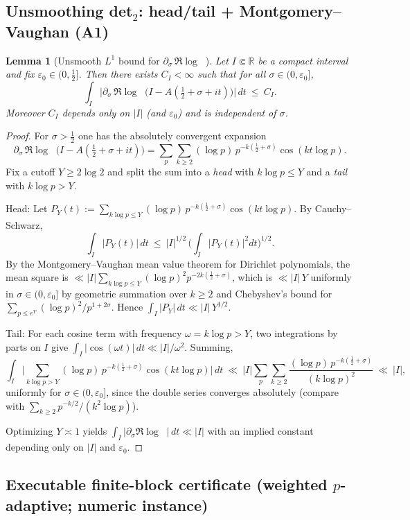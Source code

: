 \documentclass[11pt]{article}
\newtheorem{lemma}[theorem]{Lemma}
\theoremstyle{definition}
\theoremstyle{remark}
\newcommand{\R}{\mathbb{R}}
\DeclareMathOperator{\dettwo}{det_2}
\begin{document}
\subsection*{Unsmoothing det$_2$: head/tail + Montgomery--Vaughan (A1)}
\begin{lemma}[Unsmooth $L^1$ bound for $\partial_\sigma\,\Re\log\dettwo$]\label{lem:det2-unsmoothed}
Let $I\Subset\R$ be a compact interval and fix $\varepsilon_0\in(0,\tfrac12]$. Then there exists $C_I<\infty$ such that for all $\sigma\in(0,\varepsilon_0]$,
\[
  \int_I \Big|\partial_\sigma\,\Re\log\dettwo\big(I-A(\tfrac12+\sigma+it)\big)\Big|\,dt\ \le\ C_I.
\]
Moreover $C_I$ depends only on $|I|$ (and $\varepsilon_0$) and is independent of $\sigma$.
\end{lemma}
\begin{proof}
For $\sigma>\tfrac12$ one has the absolutely convergent expansion
\[
  \partial_\sigma\,\Re\log\dettwo\big(I-A(\tfrac12+\sigma+it)\big)
  = \sum_{p}\sum_{k\ge 2} (\log p)\,p^{-k(\tfrac12+\sigma)}\cos(k t\log p).
\]
Fix a cutoff $Y\ge 2\log 2$ and split the sum into a \emph{head} with $k\log p\le Y$ and a \emph{tail} with $k\log p>Y$.

Head: Let $P_Y(t):=\sum_{k\log p\le Y} (\log p)\,p^{-k(\tfrac12+\sigma)}\cos(k t\log p)$. By Cauchy--Schwarz,
\[
 \int_I |P_Y(t)|\,dt\ \le\ |I|^{1/2}\,\Big(\int_I |P_Y(t)|^2 dt\Big)^{1/2}.
\]
By the Montgomery--Vaughan mean value theorem for Dirichlet polynomials, the mean square is $\ll |I|\sum_{k\log p\le Y} (\log p)^2 p^{-2k(\tfrac12+\sigma)}$, which is $\ll |I|\,Y$ uniformly in $\sigma\in(0,\varepsilon_0]$ by geometric summation over $k\ge 2$ and Chebyshev's bound for $\sum_{p\le e^Y} (\log p)^2/p^{1+2\sigma}$. Hence $\int_I |P_Y|\,dt\ll |I|\,Y^{1/2}$.

Tail: For each cosine term with frequency $\omega=k\log p>Y$, two integrations by parts on $I$ give $\int_I |\cos(\omega t)|\,dt\ll |I|/\omega^2$. Summing,
\[
  \int_I \big|\sum_{k\log p>Y} (\log p)\,p^{-k(\tfrac12+\sigma)}\cos(k t\log p)\big|\,dt
  \ \ll\ |I|\sum_{p}\sum_{k\ge 2} \frac{(\log p)\,p^{-k(\tfrac12+\sigma)}}{(k\log p)^2}
  \ \ll\ |I|,
\]
uniformly for $\sigma\in(0,\varepsilon_0]$, since the double series converges absolutely (compare with $\sum_{k\ge 2} p^{-k/2}/(k^2\log p)$).

Optimizing $Y\asymp 1$ yields $\int_I |\partial_\sigma\Re\log\dettwo|\,dt\ll |I|$ with an implied constant depending only on $|I|$ and $\varepsilon_0$.
\end{proof}

\subsection*{Executable finite-block certificate (weighted $p$-adaptive; numeric instance)}
\end{document}
